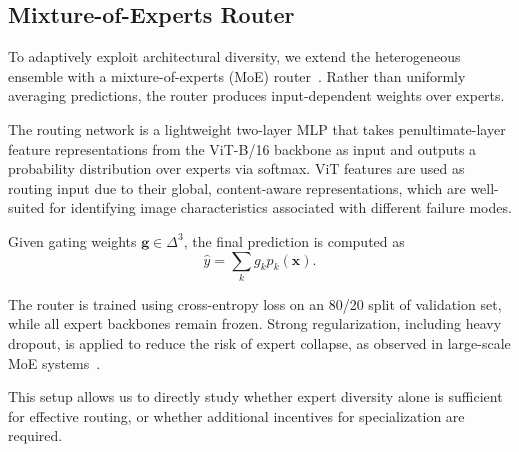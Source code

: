 \subsection{Mixture-of-Experts Router}
\label{sec:moe}

To adaptively exploit architectural diversity, we extend the heterogeneous ensemble with a mixture-of-experts (MoE) router~\citep{masoudniaMixtureExpertsLiterature2014}.
Rather than uniformly averaging predictions, the router produces input-dependent weights over experts.

The routing network is a lightweight two-layer MLP that takes penultimate-layer feature representations from the ViT-B/16 backbone as input and outputs a probability distribution over experts via softmax.
ViT features are used as routing input due to their global, content-aware representations, which are well-suited for identifying image characteristics associated with different failure modes.

Given gating weights $\mathbf{g} \in \Delta^3$, the final prediction is computed as
\[
\hat{y} = \sum_k g_k p_k (\mathbf{x}).
\]

The router is trained using cross-entropy loss on an 80/20 split of validation set, while all expert backbones remain frozen.
Strong regularization, including heavy dropout, is applied to reduce the risk of expert collapse, as observed in large-scale MoE systems~\citep{fedusSwitchTransformersScaling2021}.

This setup allows us to directly study whether expert diversity alone is sufficient for effective routing, or whether additional incentives for specialization are required.